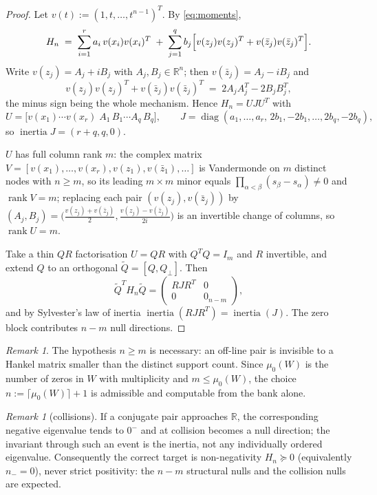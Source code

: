 \documentclass[11pt]{article}
\theoremstyle{plain}
\theoremstyle{definition}
\theoremstyle{remark}
\newtheorem{remark}[theorem]{Remark}
\newcommand{\R}{\mathbb{R}}
\DeclareMathOperator{\rank}{rank}
\DeclareMathOperator{\inertia}{inertia}
\begin{document}
\begin{proof}
Let $v(t) := (1,t,\dots,t^{n-1})^{T}$. By \eqref{eq:moments},
\[
  H_n \;=\; \sum_{i=1}^r a_i\, v(x_i)v(x_i)^{T}
  \;+\; \sum_{j=1}^q b_j\Bigl[v(z_j)v(z_j)^{T} + v(\bar z_j)v(\bar z_j)^{T}\Bigr].
\]
Write $v(z_j) = A_j + iB_j$ with $A_j,B_j\in\R^n$; then $v(\bar z_j)=A_j-iB_j$ and
\begin{equation}\label{eq:minus}
  v(z_j)v(z_j)^{T} + v(\bar z_j)v(\bar z_j)^{T}
  \;=\; 2A_jA_j^{T} - 2B_jB_j^{T},
\end{equation}
the minus sign being the whole mechanism. Hence $H_n = UJU^{T}$ with
\[
  U = \bigl[v(x_1)\cdots v(x_r)\;A_1\,B_1\cdots A_q\,B_q\bigr],
  \qquad
  J = \operatorname{diag}(a_1,\dots,a_r,\,2b_1,-2b_1,\dots,2b_q,-2b_q),
\]
so $\inertia J = (r+q,q,0)$.

$U$ has full column rank $m$: the complex matrix
$V=[v(x_1),\dots,v(x_r),v(z_1),v(\bar z_1),\dots]$ is Vandermonde on $m$ distinct nodes
with $n\ge m$, so its leading $m\times m$ minor equals
$\prod_{\alpha<\beta}(s_\beta-s_\alpha)\ne 0$ and $\rank V=m$; replacing each pair
$(v(z_j),v(\bar z_j))$ by $(A_j,B_j) = \bigl(\tfrac{v(z_j)+v(\bar z_j)}{2},
\tfrac{v(z_j)-v(\bar z_j)}{2i}\bigr)$ is an invertible change of columns, so
$\rank U = m$.

Take a thin $QR$ factorisation $U=QR$ with $Q^{T}Q=I_m$ and $R$ invertible, and extend
$Q$ to an orthogonal $\widetilde Q = [Q,Q_\perp]$. Then
\[
  \widetilde Q^{T} H_n \widetilde Q =
  \begin{pmatrix} RJR^{T} & 0\\ 0 & 0_{n-m}\end{pmatrix},
\]
and by Sylvester's law of inertia $\inertia(RJR^{T}) = \inertia(J)$. The zero block
contributes $n-m$ null directions.
\end{proof}

\begin{remark}
The hypothesis $n \ge m$ is necessary: an off-line pair is invisible to a Hankel matrix
smaller than the distinct support count. Since $\mu_0(W)$ is the number of zeros in $W$
with multiplicity and $m \le \mu_0(W)$, the choice
$n := \lceil \mu_0(W)\rceil + 1$ is admissible and computable from the bank alone.
\end{remark}

\begin{remark}[collisions]
If a conjugate pair approaches $\R$, the corresponding negative eigenvalue tends to $0^-$
and at collision becomes a null direction; the invariant through such an event is the
inertia, not any individually ordered eigenvalue. Consequently the correct target is
non-negativity $H_n \succeq 0$ (equivalently $n_-=0$), never strict positivity: the
$n-m$ structural nulls and the collision nulls are expected.
\end{remark}
\end{document}

